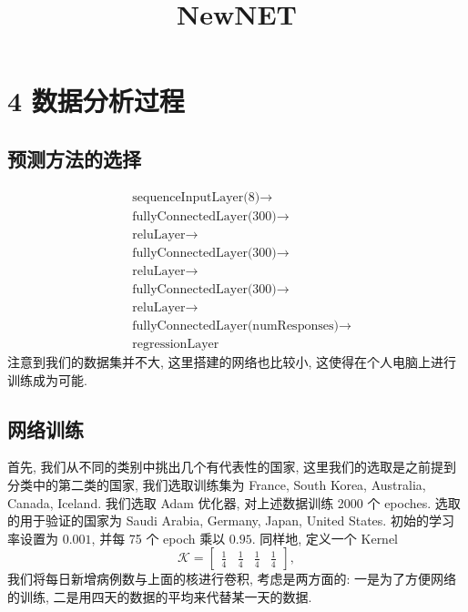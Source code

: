 \documentclass[UTF8]{ctexart}
\title{NewNET}
\author{}
\date{}
\begin{document}
	\maketitle
    \section*{4 数据分析过程}
    \subsection*{预测方法的选择}
	\begin{align*}
		&\text{sequenceInputLayer(8)} \rightarrow \\
    	&\text{fullyConnectedLayer(300)} \rightarrow \\
    	&\text{reluLayer} \rightarrow \\
    	&\text{fullyConnectedLayer(300)} \rightarrow \\
    	&\text{reluLayer} \rightarrow \\
    	&\text{fullyConnectedLayer(300)} \rightarrow \\
    	&\text{reluLayer} \rightarrow \\
    	&\text{fullyConnectedLayer(numResponses)} \rightarrow \\
    	&\text{regressionLayer}
	\end{align*}
	注意到我们的数据集并不大, 这里搭建的网络也比较小, 这使得在个人电脑上进行训练成为可能.
    \subsection*{网络训练}
    首先, 我们从不同的类别中挑出几个有代表性的国家, 这里我们的选取是之前提到分类中的第二类的国家, 我们选取训练集为 France, South Korea, Australia, Canada, Iceland. 我们选取 Adam 优化器, 对上述数据训练 2000 个 epoches. 选取的用于验证的国家为 Saudi Arabia, Germany, Japan, United States. 初始的学习率设置为 $0.001$, 并每 75 个 epoch 乘以 $0.95$. 同样地, 定义一个 Kernel
	\[
	\mathcal{K} =
	\begin{bmatrix}
		\displaystyle\frac{1}{4}&\displaystyle\frac{1}{4}&\displaystyle\frac{1}{4}&\displaystyle\frac{1}{4}
	\end{bmatrix},
	\]
	我们将每日新增病例数与上面的核进行卷积, 考虑是两方面的: 一是为了方便网络的训练, 二是用四天的数据的平均来代替某一天的数据.
	\begin{figure}[htbp]
	    \centering
	\end{figure}
\end{document}
